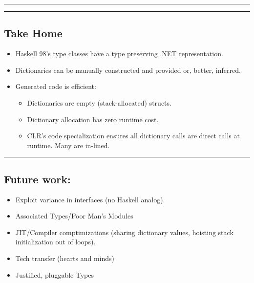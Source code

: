 \begin{center}\rule{0.5\linewidth}{\linethickness}\end{center}

\begin{center}\rule{0.5\linewidth}{\linethickness}\end{center}

\subsection{Take Home}\label{take-home}

\begin{itemize}
\tightlist
\item
  Haskell 98's type classes have a type preserving .NET representation.
\item
  Dictionaries can be manually constructed and provided or, better,
  inferred.
\item
  Generated code is efficient:

  \begin{itemize}
  \tightlist
  \item
    Dictionaries are empty (stack-allocated) structs.
  \item
    Dictionary allocation has zero runtime cost.
  \item
    CLR's code specialization ensures all dictionary calls are direct
    calls at runtime. Many are in-lined.
  \end{itemize}
\end{itemize}

\begin{center}\rule{0.5\linewidth}{\linethickness}\end{center}

\subsection{Future work:}\label{future-work}

\begin{itemize}
\tightlist
\item
  Exploit variance in interfaces (no Haskell analog).
\item
  Associated Types/Poor Man's Modules
\item
  JIT/Compiler comptimizations (sharing dictionary values, hoisting
  stack initialization out of loops).
\item
  Tech transfer (hearts and minds)
\item
  Justified, pluggable Types
\end{itemize}

